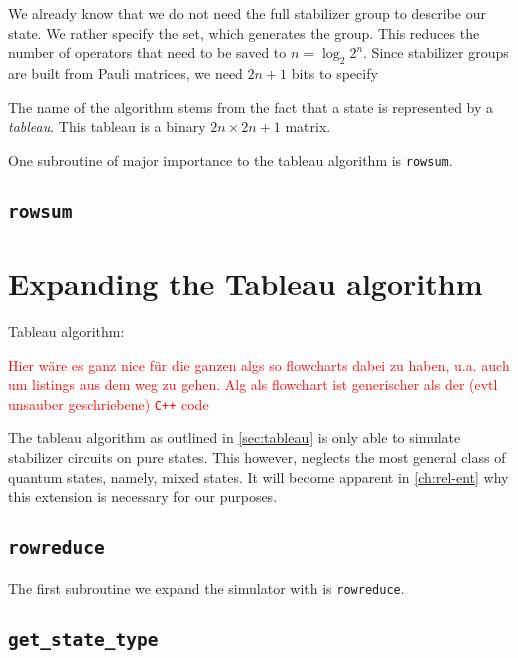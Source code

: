 We already know that we do not need the full stabilizer group to describe our
state. We rather specify the set, which generates the group. This reduces the
number of operators that need to be saved to $n=\log_{2}2^n$. Since stabilizer
groups are built from Pauli matrices, we need $2n+1$ bits to specify 

The name of the algorithm stems from the fact that a state is represented by a
\emph{tableau}. This tableau is a binary $2n\times2n+1$ matrix. 

One subroutine of major importance to the tableau algorithm is \texttt{rowsum}.

\subsection{\texttt{rowsum}}\label{sec:rowsum}

\section{Expanding the Tableau algorithm}
Tableau algorithm: \cite{aaronsonImprovedSimulationStabilizer2004}

\textcolor{red}{Hier w\"are es ganz nice f\"ur die ganzen algs so flowcharts
dabei zu haben, u.a. auch um listings aus dem weg zu gehen. Alg als flowchart
ist generischer als der (evtl unsauber geschriebene) \texttt{C++} code}

The tableau algorithm as outlined in \cref{sec:tableau} is only able to
simulate stabilizer circuits on pure states. This however, neglects the most
general class of quantum states, namely, mixed states. It will become apparent
in \cref{ch:rel-ent} why this extension is necessary for our purposes. 

\subsection{\texttt{rowreduce}}
The first subroutine we expand the simulator with is \texttt{rowreduce}. 

%  

\subsection{\texttt{get\_state\_type}}

